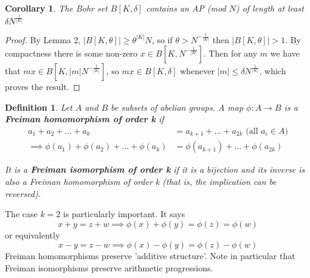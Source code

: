 \documentclass[a4paper]{article}
\newtheorem*{definition}{Definition}
\newtheorem{corollary}[lemma]{Corollary}
\newcommand*\abs[1]{\left|#1\right|}
\begin{document}
\begin{corollary}
	The Bohr set $B[K, \delta]$ contains an AP (mod $N$) of length at least $\delta N ^{\frac{1}{\abs{K}}}$
\end{corollary}
\begin{proof}
	By Lemma 2, $\abs{B[K, \theta]} \geq \theta^{\abs{K}}N$, so if $\theta > N^{-\frac{1}{\abs{K}}}$ then $\abs{B[K, \theta]} > 1$. By compactness there is some non-zero $x \in B[K, N^{-\frac{1}{\abs{K}}}]$. Then for any $m$ we have that $mx \in B[K, \abs{m}N^{-\frac{1}{\abs{K}}}]$, so $mx \in B[K, \delta]$ whenever $\abs{m} \leq \delta N^{\frac{1}{\abs{K}}}$, which proves the result.
\end{proof}

\begin{definition}
	Let $A$ and $B$ be subsets of abelian groups. A map $\phi:A \to B$ is a \textbf{Freiman homomorphism of order k} if
	\begin{align*}
		a_1 + a_2 + \dots + a_k &= a_{k+1} + \dots + a_{2k} \text{ (all $a_i \in A$)} \\
		\implies \phi(a_1) + \phi(a_2) + \dots + \phi(a_k) &= \phi(a_{k+1}) + \dots + \phi(a_{2k})
	\end{align*}
	
	It is a \textbf{Freiman isomorphism of order k} if it is a bijection and its inverse is also a Freiman homomorphism of order k (that is, the implication can be reversed).
\end{definition}

The case $k=2$ is particularly important. It says $$x+y = z+w \implies \phi(x)+ \phi(y) = \phi(z) = \phi(w)$$ or equivalently $$x-y=z-w \implies \phi(x)-\phi(y) = \phi(z)-\phi(w)$$
Freiman homomorphisms preserve 'additive structure'. Note in particular that Freiman isomorphisms preserve arithmetic progressions.
\end{document}

